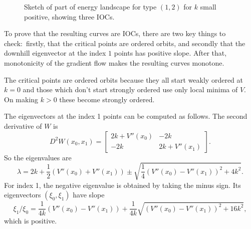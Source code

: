 \documentclass[12pt]{article}
\begin{document}
\begin{figure}[htbp]

   \caption{Sketch of part of energy landscape for type $(1,2)$ for $k$ small positive, showing three IOCs.}
   \label{fig:2IOCs+}
\end{figure}

To prove that the resulting curves are IOCs, there are two key things to check:~firstly, that the critical points are ordered orbits, and secondly that the downhill eigenvector at the index $1$ points has positive slope.  After that, monotonicity of the gradient flow makes the resulting curves monotone.

The critical points are ordered orbits because they all start weakly ordered at $k=0$ and those which don't start strongly ordered use only local minima of $V$.  On making $k>0$ these become strongly ordered.

The eigenvectors at the index 1 points can be computed as follows.  The second derivative of $W$ is
\begin{equation}
D^2W(x_0,x_1) = \left[\begin{array}{cc}
2k+V''(x_0) & -2k \\
-2k & 2k + V''(x_1)
\end{array} \right] .
\end{equation}
So the eigenvalues are
$$\lambda = 2k + \frac12 (V''(x_0)+V''(x_1)) \pm \sqrt{\frac14 (V''(x_0)-V''(x_1))^2 + 4k^2}.$$
For index 1, the negative eigenvalue is obtained by taking the minus sign.  Its eigenvectors $(\xi_0,\xi_1)$ have slope
$$\xi_1/\xi_0 = \frac{1}{4k} (V''(x_0)-V''(x_1)) + \frac{1}{4k} \sqrt{(V''(x_0)-V''(x_1))^2+16k^2},$$
which is positive.
\end{document}
